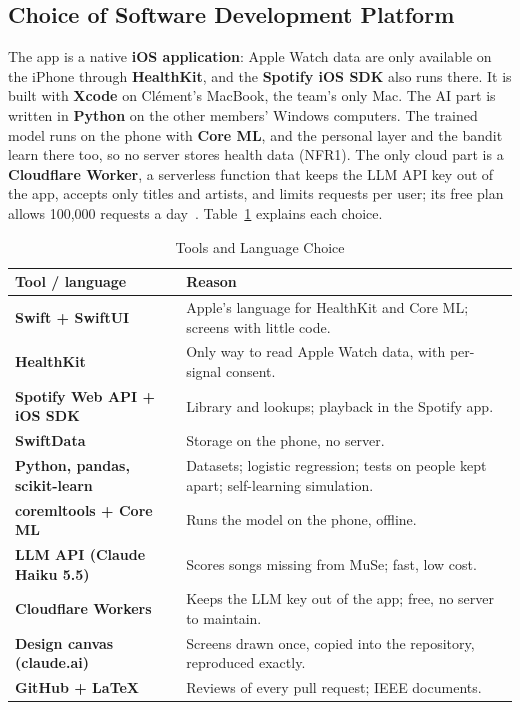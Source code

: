 \documentclass[conference]{IEEEtran}
\begin{document}
\subsection{Choice of Software Development Platform}
The app is a native \textbf{iOS application}: Apple Watch data are only available on the iPhone through \textbf{HealthKit}, and the \textbf{Spotify iOS SDK} also runs there. It is built with \textbf{Xcode} on Clément's MacBook, the team's only Mac. The AI part is written in \textbf{Python} on the other members' Windows computers. The trained model runs on the phone with \textbf{Core ML}, and the personal layer and the bandit learn there too, so no server stores health data (NFR1). The only cloud part is a \textbf{Cloudflare Worker}, a serverless function that keeps the LLM API key out of the app, accepts only titles and artists, and limits requests per user; its free plan allows 100,000 requests a day~\cite{cfworkers}. Table~\ref{tab:tools} explains each choice.

\begin{table}[H]
\centering
\caption{Tools and Language Choice}
\label{tab:tools}
\scriptsize
\begin{tabularx}{\columnwidth}{|>{\raggedright\arraybackslash}p{1.85cm}|>{\raggedright\arraybackslash}X|}
\hline
\textbf{Tool / language} & \textbf{Reason} \\ \hline
\textbf{Swift + SwiftUI} & Apple's language for HealthKit and Core ML; screens with little code. \\ \hline
\textbf{HealthKit} & Only way to read Apple Watch data, with per-signal consent. \\ \hline
\textbf{Spotify Web API + iOS SDK} & Library and lookups; playback in the Spotify app. \\ \hline
\textbf{SwiftData} & Storage on the phone, no server. \\ \hline
\textbf{Python, pandas, scikit-learn} & Datasets; logistic regression; tests on people kept apart; self-learning simulation. \\ \hline
\textbf{coremltools + Core ML} & Runs the model on the phone, offline. \\ \hline
\textbf{LLM API (Claude Haiku 5.5)} & Scores songs missing from MuSe; fast, low cost. \\ \hline
\textbf{Cloudflare Workers} & Keeps the LLM key out of the app; free, no server to maintain. \\ \hline
\textbf{Design canvas (claude.ai)} & Screens drawn once, copied into the repository, reproduced exactly. \\ \hline
\textbf{GitHub + LaTeX} & Reviews of every pull request; IEEE documents. \\ \hline
\end{tabularx}
\end{table}
\end{document}

